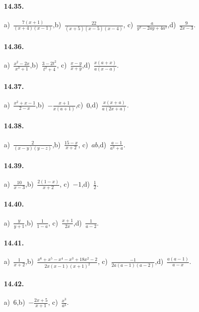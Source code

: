 \paragraph{14.35.}
a)~$\frac{7(x+1)}{(x+4)(x-1)}$,\quad b)~$\frac{22}{(x+5)(x-5)(x-4)}$, \quad c)~$\frac{a}{y^{2}-2ay+4a^{2}}$,\quad d)~$\frac{9}{2x-3}$.

\paragraph{14.36.}
a)~$\frac{x^{2}-2x}{x^{3}+1}$,\quad b)~$\frac{3-2t^{2}}{t^{2}+4}$, \quad c)~$\frac{x-y}{x+y}$,\quad d)~$\frac{x(a+x)}{a(x-a)}$.

\paragraph{14.37.}
a)~$\frac{x^{2}+x-1}{2-x}$,\quad b)~$-\frac{x+1}{x(a+1)}$,\quad c)~$0$,\quad d)~$\frac{x(x+a)}{a(2x+a)}$.

\paragraph{14.38.}
a)~$\frac{2}{(x-y)(y-z)}$,\quad b)~$\frac{15-x}{x+2}$, \quad c)~$ab$,\quad d)~$\frac{a-1}{a^{2}+a}$.

\paragraph{14.39.}
a)~$\frac{10}{x-3}$,\quad b)~$\frac{2(1-x)}{x+2}$, \quad c)~$-1$,\quad d)~$\frac{1}{2}$.

\paragraph{14.40.}
a)~$\frac{y}{y+1}$,\quad b)~$\frac{1}{1-a}$, \quad c)~$\frac{x+1}{2x}$,\quad d)~$\frac{1}{a-2}$.

\paragraph{14.41.}
a)~$\frac{1}{x+2}$,\quad b)~$\frac{x^{6}+x^{5}-x^{4}-x^{3}+18x^{2}-2}{2x(x-1)(x+1)^{2}}$, \quad c)~$\frac{-1}{2a(a-1)(a-2)}$,\quad d)~$\frac{a(a-1)}{a-x}$.

\paragraph{14.42.}
a)~$6$,\quad b)~$-\frac{2x+5}{x+1}$, \quad c)~$\frac{x^{3}}{a^{3}}$.

